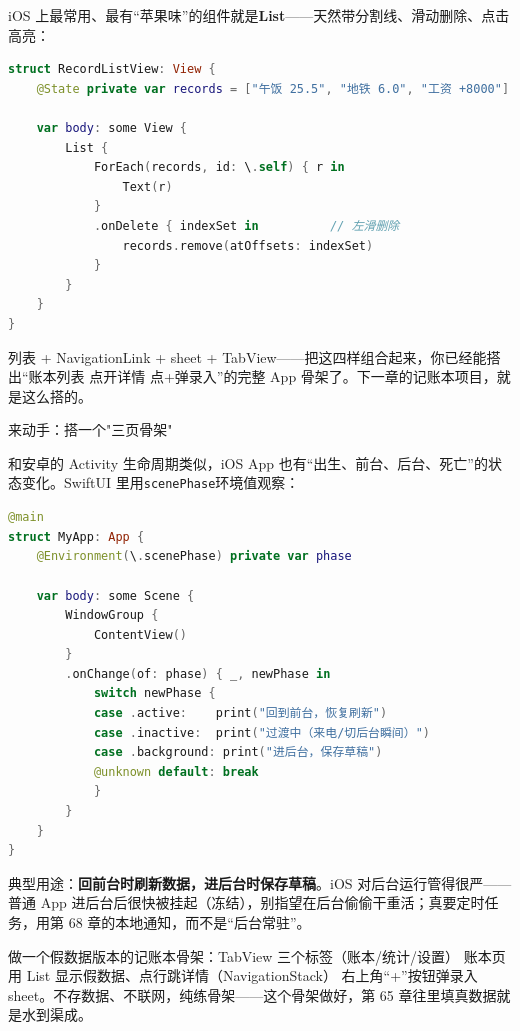 
iOS 上最常用、最有“苹果味”的组件就是\textbf{List}——天然带分割线、滑动删除、点击高亮：

\begin{lstlisting}[language=Swift]
struct RecordListView: View {
    @State private var records = ["午饭 25.5", "地铁 6.0", "工资 +8000"]

    var body: some View {
        List {
            ForEach(records, id: \.self) { r in
                Text(r)
            }
            .onDelete { indexSet in          // 左滑删除
                records.remove(atOffsets: indexSet)
            }
        }
    }
}
\end{lstlisting}

列表 + NavigationLink + sheet + TabView——把这四样组合起来，你已经能搭出“账本列表 点开详情 点+弹录入”的完整 App 骨架了。下一章的记账本项目，就是这么搭的。

\begin{tcbpractice}{来动手：搭一个"三页骨架"}

和安卓的 Activity 生命周期类似，iOS App 也有“出生、前台、后台、死亡”的状态变化。SwiftUI 里用\texttt{scenePhase}环境值观察：

\begin{lstlisting}[language=Swift]
@main
struct MyApp: App {
    @Environment(\.scenePhase) private var phase

    var body: some Scene {
        WindowGroup {
            ContentView()
        }
        .onChange(of: phase) { _, newPhase in
            switch newPhase {
            case .active:    print("回到前台，恢复刷新")
            case .inactive:  print("过渡中（来电/切后台瞬间）")
            case .background: print("进后台，保存草稿")
            @unknown default: break
            }
        }
    }
}
\end{lstlisting}

典型用途：\textbf{回前台时刷新数据，进后台时保存草稿}。iOS 对后台运行管得很严——普通 App 进后台后很快被挂起（冻结），别指望在后台偷偷干重活；真要定时任务，用第 68 章的本地通知，而不是“后台常驻”。

做一个假数据版本的记账本骨架：TabView 三个标签（账本/统计/设置） 账本页用 List 显示假数据、点行跳详情（NavigationStack） 右上角“+”按钮弹录入 sheet。不存数据、不联网，纯练骨架——这个骨架做好，第 65 章往里填真数据就是水到渠成。

\end{tcbpractice}

